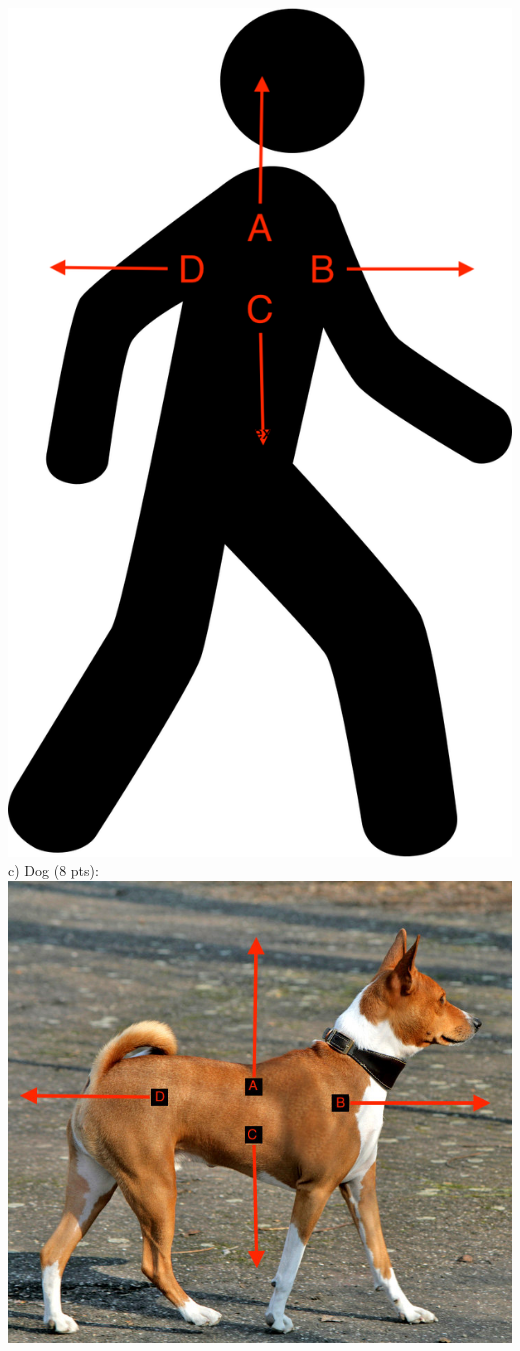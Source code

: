 \documentclass{article}
\begin{document}
\includegraphics[scale = .12]{man.png}
\\c) Dog (8 pts):\\
\includegraphics[scale = .23]{dog_directions.jpg}
\end{document}

